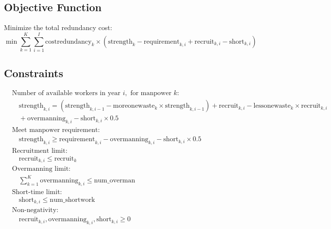 \documentclass{article}
\begin{document}
\subsection*{Objective Function}
Minimize the total redundancy cost:
\[
\min \sum_{k=1}^{K} \sum_{i=1}^{I} \text{costredundancy}_{k} \times (\text{strength}_{k} - \text{requirement}_{k, i} + \text{recruit}_{k, i} - \text{short}_{k, i})
\]

\subsection*{Constraints}
\begin{align}
    & \text{Number of available workers in year } i, \text{ for manpower } k: \nonumber \\
    & \quad \text{strength}_{k, i} = (\text{strength}_{k, i-1} - \text{moreonewaste}_{k} \times \text{strength}_{k, i-1}) + \text{recruit}_{k, i} - \text{lessonewaste}_{k} \times \text{recruit}_{k, i} \nonumber \\
    & \quad + \text{overmanning}_{k, i} - \text{short}_{k, i} \times 0.5 \label{eq:manpower_balance} \\[10pt]
    & \text{Meet manpower requirement:} \nonumber \\
    & \quad \text{strength}_{k, i} \geq \text{requirement}_{k, i} - \text{overmanning}_{k, i} - \text{short}_{k, i} \times 0.5 \\
    & \text{Recruitment limit:} \nonumber \\
    & \quad \text{recruit}_{k, i} \leq \text{recruit}_{k} \\
    & \text{Overmanning limit:} \nonumber \\
    & \quad \sum_{k=1}^{K} \text{overmanning}_{k, i} \leq \text{num\_overman} \\
    & \text{Short-time limit:} \nonumber \\
    & \quad \text{short}_{k, i} \leq \text{num\_shortwork} \\
    & \text{Non-negativity:} \nonumber \\
    & \quad \text{recruit}_{k, i}, \text{overmanning}_{k, i}, \text{short}_{k, i} \geq 0
\end{align}
\end{document}
